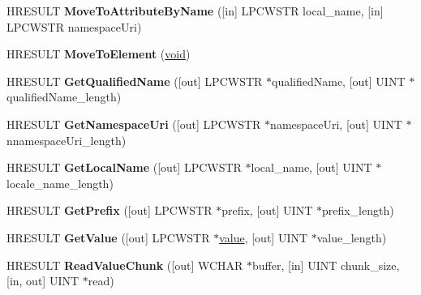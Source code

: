 \begin{DoxyCompactItemize}
H\+R\+E\+S\+U\+LT {\bfseries Move\+To\+Attribute\+By\+Name} (\mbox{[}in\mbox{]} L\+P\+C\+W\+S\+TR local\+\_\+name, \mbox{[}in\mbox{]} L\+P\+C\+W\+S\+TR namespace\+Uri)
\item 
\mbox{\label{interface_i_xml_reader_aabda222b12772d92e4823cb4386f5900}} 
H\+R\+E\+S\+U\+LT {\bfseries Move\+To\+Element} (\hyperlink{interfacevoid}{void})
\item 
\mbox{\label{interface_i_xml_reader_add7c76080b930a6deccc76b12a95573d}} 
H\+R\+E\+S\+U\+LT {\bfseries Get\+Qualified\+Name} (\mbox{[}out\mbox{]} L\+P\+C\+W\+S\+TR $\ast$qualified\+Name, \mbox{[}out\mbox{]} U\+I\+NT $\ast$qualified\+Name\+\_\+length)
\item 
\mbox{\label{interface_i_xml_reader_aeece7b5c4e72f4e04f34811bf145fc42}} 
H\+R\+E\+S\+U\+LT {\bfseries Get\+Namespace\+Uri} (\mbox{[}out\mbox{]} L\+P\+C\+W\+S\+TR $\ast$namespace\+Uri, \mbox{[}out\mbox{]} U\+I\+NT $\ast$nnamespace\+Uri\+\_\+length)
\item 
\mbox{\label{interface_i_xml_reader_a697a4c402c21e006e9a3d0374e22ac39}} 
H\+R\+E\+S\+U\+LT {\bfseries Get\+Local\+Name} (\mbox{[}out\mbox{]} L\+P\+C\+W\+S\+TR $\ast$local\+\_\+name, \mbox{[}out\mbox{]} U\+I\+NT $\ast$locale\+\_\+name\+\_\+length)
\item 
\mbox{\label{interface_i_xml_reader_aed792ded37e71d47fd164b1b4b920c7a}} 
H\+R\+E\+S\+U\+LT {\bfseries Get\+Prefix} (\mbox{[}out\mbox{]} L\+P\+C\+W\+S\+TR $\ast$prefix, \mbox{[}out\mbox{]} U\+I\+NT $\ast$prefix\+\_\+length)
\item 
\mbox{\label{interface_i_xml_reader_a5fe415963563a516ab1d7ce6e5cd477f}} 
H\+R\+E\+S\+U\+LT {\bfseries Get\+Value} (\mbox{[}out\mbox{]} L\+P\+C\+W\+S\+TR $\ast$\hyperlink{unionvalue}{value}, \mbox{[}out\mbox{]} U\+I\+NT $\ast$value\+\_\+length)
\item 
\mbox{\label{interface_i_xml_reader_a8d8d20f907fde65e62745c83366684a0}} 
H\+R\+E\+S\+U\+LT {\bfseries Read\+Value\+Chunk} (\mbox{[}out\mbox{]} W\+C\+H\+AR $\ast$buffer, \mbox{[}in\mbox{]} U\+I\+NT chunk\+\_\+size, \mbox{[}in, out\mbox{]} U\+I\+NT $\ast$read)

\end{DoxyCompactItemize}
